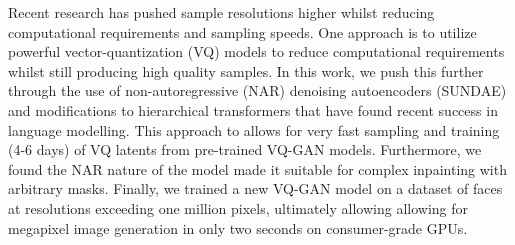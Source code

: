 Recent research has pushed sample resolutions higher whilst reducing
computational requirements and sampling speeds. One approach is to utilize
powerful vector-quantization (VQ) models to reduce computational requirements
whilst still producing high quality samples. In this work, we push this further
through the use of non-autoregressive (NAR) denoising autoencoders (SUNDAE) and
modifications to hierarchical transformers that have found recent success in
language modelling. This approach to allows for very fast sampling and training
(4-6 days) of VQ latents from pre-trained VQ-GAN models. Furthermore, we found
the NAR nature of the model made it suitable for complex
inpainting with arbitrary masks. Finally, we trained a new VQ-GAN model on a
dataset of faces at resolutions exceeding one million pixels, ultimately
allowing allowing for megapixel image generation in only two seconds on
consumer-grade GPUs.

